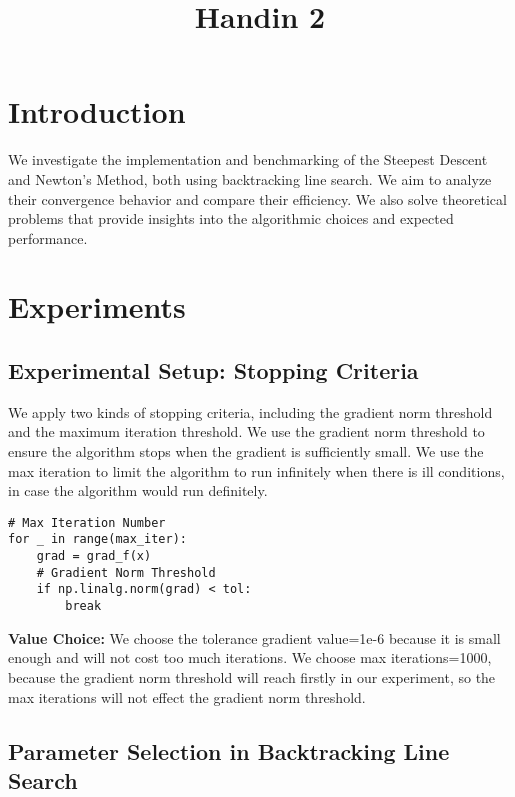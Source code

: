 \documentclass[12pt]{article}
\title{Handin 2}
\begin{document}
\maketitle

\section{Introduction}

We investigate the implementation and benchmarking of the Steepest Descent and Newton's Method, both using backtracking line search. We aim to analyze their convergence behavior and compare their efficiency.  We also solve theoretical problems that provide insights into the algorithmic choices and expected performance.

\section{Experiments}

\subsection{Experimental Setup: Stopping Criteria}
We apply two kinds of stopping criteria, including the gradient norm threshold and the maximum iteration threshold. We use the gradient norm threshold to ensure the algorithm stops when the gradient is sufficiently small. We use the max iteration to limit the algorithm to run infinitely when there is ill conditions, in case the algorithm would run definitely.

\begin{lstlisting}
# Max Iteration Number
for _ in range(max_iter): 
    grad = grad_f(x)
    # Gradient Norm Threshold 
    if np.linalg.norm(grad) < tol:
        break
\end{lstlisting}

\textbf{Value Choice: }We choose the tolerance gradient value=1e-6 because it is small enough and will not cost too much iterations. We choose max iterations=1000, because the gradient norm threshold will reach firstly in our experiment, so the max iterations will not effect the gradient norm threshold. 

\subsection{Parameter Selection in Backtracking Line Search }
\end{document}
